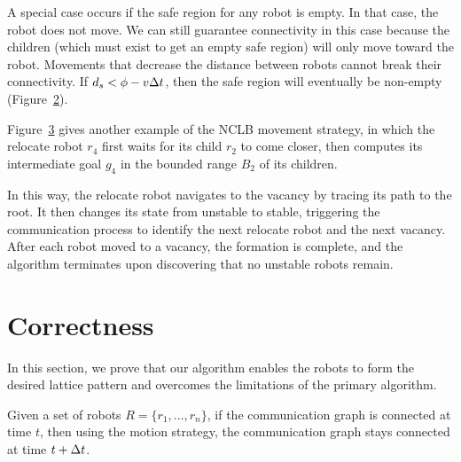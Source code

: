 A special case occurs if the safe region for any robot is empty.
%
In that case, the robot does not move.  
%
We can still guarantee connectivity in this case
because the children (which must exist to get an empty safe region) will only
move toward the robot.  
%
Movements that decrease the distance between robots
cannot break their connectivity.  
%
If \hbox{$d_s < \phi - v\Delta t$}, then the safe
region will eventually be non-empty (Figure~\ref{fig:safedist2}).

Figure~\ref{fig:safedist} gives another example of the NCLB movement strategy,
in which the relocate robot $r_4$ first waits for its child $r_2$ to come closer, then
computes its intermediate goal $g_4$ in the bounded range $B_2$ of its children.


In this way, the relocate robot navigates to the vacancy by tracing its path to the root.  
%
It then changes its
state from unstable to stable, triggering the communication process to identify
the next relocate robot and the next vacancy.  
%
After each robot moved to a
vacancy, the formation is complete, and the algorithm terminates upon
discovering that no unstable robots remain.

\begin{figure}
\centering

\label{fig:nclb}
\end{figure}
\begin{figure}
\centering

\label{fig:safedist2}
\end{figure}
\begin{figure}
\centering

\label{fig:safedist}
\end{figure}


\section{Correctness}
\label{sec:proof}
In this section, we prove that our algorithm enables the robots to form the desired lattice pattern and overcomes the limitations of the primary algorithm.

\begin{lem}
\label{lem:connected}
    Given a set of robots $R =\{r_1, \ldots, r_n\}$, if the
    communication graph is connected at time $t$, then using the motion
    strategy, the communication graph stays connected at time $t+\Delta t$.
\end{lem}

